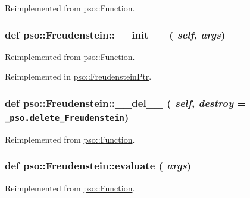 Reimplemented from \hyperlink{classpso_1_1Function_959f07a6de4f333461fdb0261e6c25ae}{pso::Function}.\hypertarget{classpso_1_1Freudenstein_5bede09ddc059943e97451908bf5b622}{
\subsubsection{\setlength{\rightskip}{0pt plus 5cm}def pso::Freudenstein::\_\-\_\-init\_\-\_\- ( {\em self}, \/   {\em args})}}
\label{classpso_1_1Freudenstein_5bede09ddc059943e97451908bf5b622}




Reimplemented from \hyperlink{classpso_1_1Function_6874097c6476dc85af64b40e76a807e9}{pso::Function}.

Reimplemented in \hyperlink{classpso_1_1FreudensteinPtr_605822702b355b32a6ca939c0aae1656}{pso::FreudensteinPtr}.\hypertarget{classpso_1_1Freudenstein_bcb8a7755b12ba21aa67353f25b4b243}{
\subsubsection{\setlength{\rightskip}{0pt plus 5cm}def pso::Freudenstein::\_\-\_\-del\_\-\_\- ( {\em self}, \/   {\em destroy} = {\tt \_\-pso.delete\_\-Freudenstein})}}
\label{classpso_1_1Freudenstein_bcb8a7755b12ba21aa67353f25b4b243}




Reimplemented from \hyperlink{classpso_1_1Function_c80bd40fcf4a956e5732ed099bccc598}{pso::Function}.\hypertarget{classpso_1_1Freudenstein_bfe2aea7372da1083a9f562ec6c4ed82}{
\subsubsection{\setlength{\rightskip}{0pt plus 5cm}def pso::Freudenstein::evaluate ( {\em args})}}
\label{classpso_1_1Freudenstein_bfe2aea7372da1083a9f562ec6c4ed82}




Reimplemented from \hyperlink{classpso_1_1Function_7c958ea6d942a89ae219b872b4d73541}{pso::Function}.


